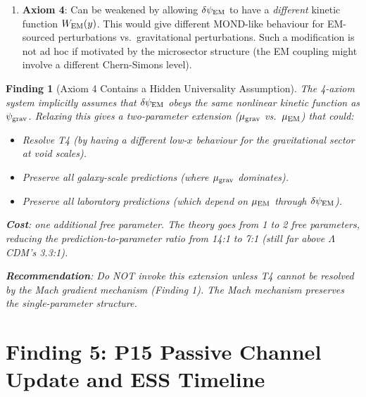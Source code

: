 \documentclass[11pt]{article}
\newtheorem{finding}{Finding}
\newcommand{\psigrav}{\psi_{\rm grav}}
\newcommand{\dpsiEM}{\delta\psi_{\rm EM}}
\newcommand{\mufd}{\mu}
\newcommand{\LCDM}{$\Lambda$CDM}
\begin{document}
\begin{enumerate}
  \textbf{Conclusion}: $\mufd(x) = x/(1+x)$ IS uniquely forced by the
  $S^3$ composition law plus the four standard constraints, but the
  chain has four distinct assumptions. Weakening any one gives a
  different $\mufd$ family.

\item \textbf{Axiom 4}: Can be weakened by allowing $\dpsiEM$ to have a
  \emph{different} kinetic function $W_{\rm EM}(y)$. This would give
  different MOND-like behaviour for EM-sourced perturbations vs.\
  gravitational perturbations. Such a modification is not ad hoc if
  motivated by the microsector structure (the EM coupling might involve
  a different Chern-Simons level).
\end{enumerate}

\begin{finding}[Axiom 4 Contains a Hidden Universality Assumption]
\label{find:axiom4}
The 4-axiom system implicitly assumes that $\dpsiEM$ obeys the same
nonlinear kinetic function as $\psigrav$. Relaxing this gives a
two-parameter extension ($\mufd_{\rm grav}$ vs.\ $\mufd_{\rm EM}$)
that could:
\begin{itemize}[nosep]
\item Resolve T4 (by having a \emph{different} low-$x$ behaviour for
  the gravitational sector at void scales).
\item Preserve all galaxy-scale predictions (where $\mufd_{\rm grav}$
  dominates).
\item Preserve all laboratory predictions (which depend on
  $\mufd_{\rm EM}$ through $\dpsiEM$).
\end{itemize}

\textbf{Cost}: one additional free parameter. The theory goes from
1 to 2 free parameters, reducing the prediction-to-parameter ratio
from 14:1 to 7:1 (still far above \LCDM's 3.3:1).

\textbf{Recommendation}: Do NOT invoke this extension unless T4
cannot be resolved by the Mach gradient mechanism (Finding 1). The
Mach mechanism preserves the single-parameter structure.
\end{finding}


\part{Finding 5: P15 Passive Channel Update and ESS Timeline}
\label{part:P15}
\end{document}
